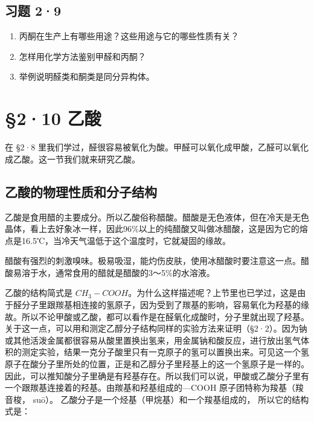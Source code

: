\subsection{习题 2·9}

\begin{enumerate}
\item
  丙酮在生产上有哪些用途？这些用途与它的哪些性质有关？
\item
  怎样用化学方法鉴别甲醛和丙酮？
\item
  举例说明醛类和酮类是同分异构体。
\end{enumerate}

\section{§2·10 乙酸}

在 §2·8
里我们学过，醛很容易被氧化为酸。甲醛可以氧化成甲酸，乙醛可以氧化成乙酸。这一节我们就来研究乙酸。

\subsection{乙酸的物理性质和分子结构}

乙酸是食用醋的主要成分。所以乙酸俗称醋酸。醋酸是无色液体，但在冷天是无色晶体，看上去好象冰一样，因此96\%以上的纯醋酸又叫做冰醋酸，这是因为它的熔点是16.5℃，当冷天气温低于这个温度时，它就凝固的缘故。

醋酸有强烈的刺激嗅味。极易吸湿，能灼伤皮肤，使用冰醋酸时要注意这一点。醋酸易溶于水，通常食用的醋就是醋酸的3～5\%的水溶液。

乙酸的结构简式是
\(CH_{3}-COOH\)。为什么这样描述呢？上节里也已学过，这是由于醛分子里跟羰基相连接的氢原子，因为受到了羰基的影响，容易氧化为羟基的缘故。所以不论甲酸或乙酸，都可以看作是在醛氧化成酸时，分子里就出现了羟基。关于这一点，可以用和测定乙醇分子结构同样的实验方法来证明（§2·2）。因为钠或其他活泼金属都很容易从酸里置换出氢来，用金属钠和酸反应，进行放出氢气体积的测定实验，结果一克分子酸里只有一克原子的氢可以置换出来。可见这一个氢原子在酸分子里所处的位置，正是和乙醇分子里羟基上的这一个氢原子是一样的。因此，可以推知酸分子里确是有羟基存在。所以我们可以说，甲酸或乙酸分子里有一个跟羰基连接着的羟基。由羰基和羟基组成的---COOH
原子团特称为羧基（羧音梭， suō）。
乙酸分子是一个烃基（甲烷基）和一个羧基组成的， 所以它的结构式是：

